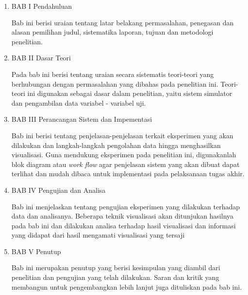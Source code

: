\begin{enumerate}[nolistsep]
	\item BAB I Pendahuluan

	Bab ini berisi uraian tentang latar belakang permasalahan, penegasan dan alasan pemilihan judul, sistematika laporan, tujuan dan metodologi penelitian.
	\vspace{1ex}

	\item BAB II Dasar Teori

	Pada bab ini berisi tentang uraian secara sistematis teori-teori yang berhubungan dengan permasalahan yang dibahas pada penelitian ini. Teori-teori ini digunakan sebagai dasar dalam penelitian, yaitu sistem simulator dan pengambilan data variabel - variabel uji.
	\vspace{1ex}

	\item BAB III Perancangan Sistem dan Impementasi

	Bab ini berisi tentang penjelasan-penjelasan terkait eksperimen yang akan dilakukan dan langkah-langkah pengolahan data hingga menghasilkan visualisasi. Guna mendukung eksperimen pada penelitian ini, digunakanlah blok diagram atau \textit{work flow} agar penjelasan sistem yang akan dibuat dapat terlihat dan mudah dibaca untuk implementasi pada pelaksanaan tugas akhir.
	\vspace{1ex}

	\item BAB IV Pengujian dan Analisa

	Bab ini menjelaskan tentang pengujian eksperimen yang dilakukan terhadap data dan analisanya. Beberapa teknik visualisasi akan ditunjukan hasilnya pada bab ini dan dilakukan analisa terhadap hasil visualisasi dan informasi yang didapat dari hasil mengamati visualisasi yang tersaji
	\vspace{1ex}

	\item BAB V Penutup

	Bab ini merupakan penutup yang berisi kesimpulan yang diambil dari penelitian dan pengujian yang telah dilakukan. Saran dan kritik yang membangun untuk pengembangkan lebih lanjut juga dituliskan pada bab ini.
\end{enumerate}
\vspace{1ex}

